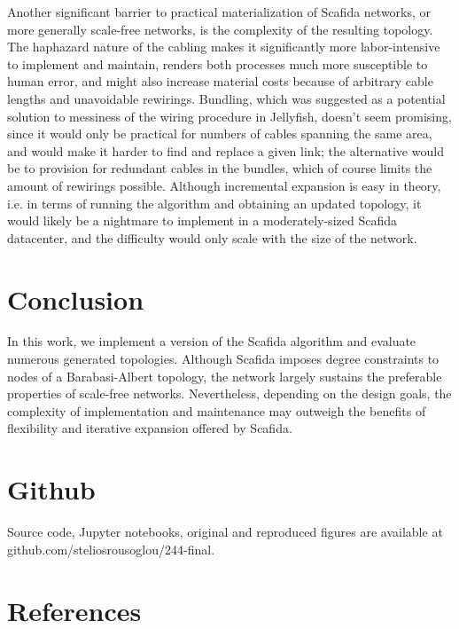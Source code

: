 Another significant barrier to practical materialization of Scafida networks, or more generally scale-free networks, is the complexity of the resulting topology. The haphazard nature of the cabling makes it significantly more labor-intensive to implement and maintain, renders both processes much more susceptible to human error, and might also increase material costs because of arbitrary cable lengths and unavoidable rewirings. Bundling, which was suggested as a potential solution to messiness of the wiring procedure in Jellyfish, doesn't seem promising, since it would only be practical for numbers of cables spanning the same area, and would make it harder to find and replace a given link; the alternative would be to provision for redundant cables in the bundles, which of course limits the amount of rewirings possible. Although incremental expansion is easy in theory, i.e. in terms of running the algorithm and obtaining an updated topology, it would likely be a nightmare to implement in a moderately-sized Scafida datacenter, and the difficulty would only scale with the size of the network.

\vspace{9pt}

\section{Conclusion}

In this work, we implement a version of the Scafida algorithm and evaluate numerous generated topologies. Although Scafida imposes degree constraints to nodes of a Barabasi-Albert topology, the network largely sustains the preferable properties of scale-free networks. Nevertheless, depending on the design goals, the complexity of implementation and maintenance may outweigh the benefits of flexibility and iterative expansion offered by Scafida.

\section{Github}

Source code, Jupyter notebooks, original and reproduced figures are available at github.com/steliosrousoglou/244-final.

\section{References}

